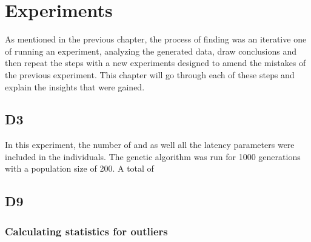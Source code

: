 \chapter{Experiments}
As mentioned in the previous chapter, the process of finding was an iterative one of running an experiment, analyzing the generated data, draw conclusions and then repeat the steps with a new experiments designed to amend the mistakes of the previous experiment. This chapter will go through each of these steps and explain the insights that were gained.

\section{D3}
In this experiment, the number of \ssmmnAgents and \scnAgents as well all the latency parameters were included in the individuals. The genetic algorithm was run for 1000 generations with a population size of 200. A total of 


\section{D9}

\subsection{Calculating statistics for outliers}

